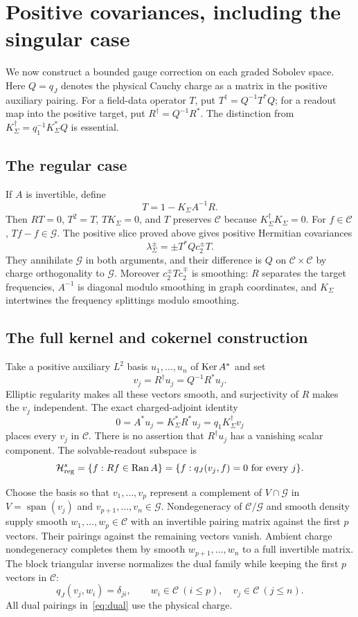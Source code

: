 \section{Positive covariances, including the singular case}\label{sec:covariances}
We now construct a bounded gauge correction on each graded Sobolev space.
Here $Q=q_J$ denotes the physical Cauchy charge as a matrix in the positive auxiliary pairing.
For a field-data operator $T$, put $T^\dagger=Q^{-1}T^*Q$; for a readout map into the positive target, put $R^\dagger=Q^{-1}R^*$.
The distinction from $K_\Sigma^\dagger=q_1^{-1}K_\Sigma^*Q$ is essential.

\subsection{The regular case}
If $A$ is invertible, define
\[
T=1-K_\Sigma A^{-1}R.
\]
Then $RT=0$, $T^2=T$, $TK_\Sigma=0$, and $T$ preserves $\mathcal C$ because $K_\Sigma^\dagger K_\Sigma=0$.
For $f\in\mathcal C$, $Tf-f\in\mathcal G$.
The positive slice proved above gives positive Hermitian covariances
\[
\lambda_\Sigma^\pm=\pm T^*Q c_2^\pm T.
\]
They annihilate $\mathcal G$ in both arguments, and their difference is $Q$ on $\mathcal C\times\mathcal C$ by charge orthogonality to $\mathcal G$.
Moreover $c_2^\pm Tc_2^\mp$ is smoothing: $R$ separates the target frequencies, $A^{-1}$ is diagonal modulo smoothing in graph coordinates, and $K_\Sigma$ intertwines the frequency splittings modulo smoothing.

\subsection{The full kernel and cokernel construction}
Take a positive auxiliary $L^2$ basis $u_1,\ldots,u_n$ of $\operatorname{Ker} A^*$ and set
\[
v_j=R^\dagger u_j=Q^{-1}R^*u_j.
\]
Elliptic regularity makes all these vectors smooth, and surjectivity of $R$ makes the $v_j$ independent.
The exact charged-adjoint identity
\[
0=A^*u_j=K_\Sigma^*R^*u_j=q_1K_\Sigma^\dagger v_j
\]
places every $v_j$ in $\mathcal C$.
There is no assertion that $R^\dagger u_j$ has a vanishing scalar component.
The solvable-readout subspace is
\[
\mathcal H_{\mathrm{reg}}^s
=\{f:Rf\in\operatorname{Ran} A\}
=\{f:q_J(v_j,f)=0\text{ for every }j\}.
\]

Choose the basis so that $v_1,\ldots,v_p$ represent a complement of $V\cap\mathcal G$ in $V=\operatorname{span}(v_j)$ and $v_{p+1},\ldots,v_n\in\mathcal G$.
Nondegeneracy of $\mathcal C/\mathcal G$ and smooth density supply smooth $w_1,\ldots,w_p\in\mathcal C$ with an invertible pairing matrix against the first $p$ vectors.
Their pairings against the remaining vectors vanish.
Ambient charge nondegeneracy completes them by smooth $w_{p+1},\ldots,w_n$ to a full invertible matrix.
The block triangular inverse normalizes the dual family while keeping the first $p$ vectors in $\mathcal C$:
\begin{equation}\label{eq:dual}
q_J(v_j,w_i)=\delta_{ji},\qquad
w_i\in\mathcal C\ (i\le p),\quad v_j\in\mathcal C\ (j\le n).
\end{equation}
All dual pairings in~\eqref{eq:dual} use the physical charge.

